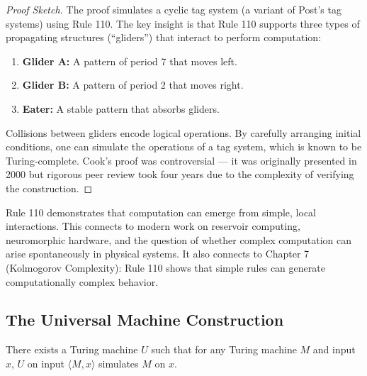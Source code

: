 \begin{proof}[Proof Sketch]
The proof simulates a cyclic tag system (a variant of Post's tag systems) using Rule 110. The key insight is that Rule 110 supports three types of propagating structures (``gliders'') that interact to perform computation:
\begin{enumerate}
\item \textbf{Glider A:} A pattern of period 7 that moves left.
\item \textbf{Glider B:} A pattern of period 2 that moves right.
\item \textbf{Eater:} A stable pattern that absorbs gliders.
\end{enumerate}
Collisions between gliders encode logical operations. By carefully arranging initial conditions, one can simulate the operations of a tag system, which is known to be Turing-complete. Cook's proof was controversial --- it was originally presented in 2000 but rigorous peer review took four years due to the complexity of verifying the construction.
\end{proof}

Rule 110 demonstrates that computation can emerge from simple, local interactions. This connects to modern work on reservoir computing, neuromorphic hardware, and the question of whether complex computation can arise spontaneously in physical systems. It also connects to Chapter 7 (Kolmogorov Complexity): Rule 110 shows that simple rules can generate computationally complex behavior.

\subsection{The Universal Machine Construction}
\label{sec:computation:universal}

\begin{theorem}
There exists a Turing machine $U$ such that for any Turing machine $M$ and input $x$, $U$ on input $\langle M, x \rangle$ simulates $M$ on $x$.
\end{theorem}

